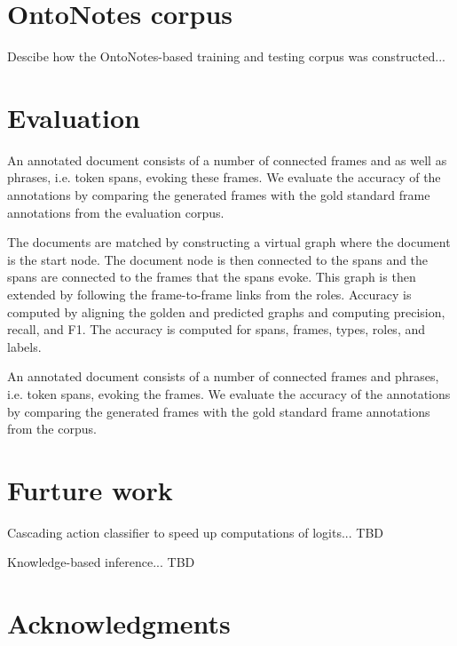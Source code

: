\documentclass[11pt,a4paper]{article}
\begin{document}
\section{OntoNotes corpus}

Descibe how the OntoNotes-based training and testing corpus was constructed...

\section{Evaluation}

An annotated document consists of a number of connected frames and as well as
phrases, i.e. token spans, evoking these frames. We evaluate the accuracy of the
annotations by comparing the generated frames with the gold standard frame
annotations from the evaluation corpus.

The documents are matched by constructing a virtual graph where the document
is the start node. The document node is then connected to the spans and the
spans are connected to the frames that the spans evoke. This graph is then
extended by following the frame-to-frame links from the roles. Accuracy is
computed by aligning the golden and predicted graphs and computing precision,
recall, and F1. The accuracy is computed for spans, frames, types, roles, and
labels.

An annotated document consists of a number of connected frames and phrases, i.e.
token spans, evoking the frames. We evaluate the accuracy of the annotations
by comparing the generated frames with the gold standard frame annotations from
the corpus.

\section{Furture work}

Cascading action classifier to speed up computations of logits... TBD

Knowledge-based inference... TBD

\section{Acknowledgments}



\end{document}

